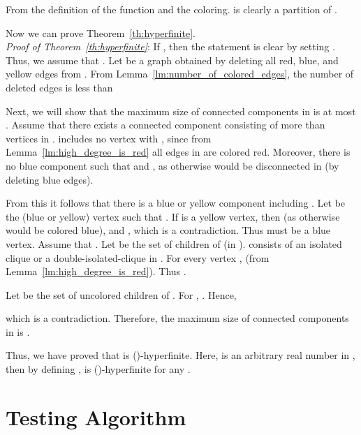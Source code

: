 \documentclass[11pt]{article}
\newcommand{\qed}{\hspace*{\fill} }
\begin{document}
From the definition of the function  and the coloring. 
 is clearly a partition of . 




Now we can prove Theorem~\ref{th:hyperfinite}. \\



\noindent
{\em Proof of Theorem~\ref{th:hyperfinite}}: 
If , 
then the statement is clear by setting 
. 
Thus, we assume that 
. 
Let  be a graph obtained by deleting all red, blue, and yellow edges from . 
From Lemma~\ref{lm:number_of_colored_edges}, 
the number of deleted edges is less than 


Next, we will show that 
the maximum size of connected components in  is at most 
. 
Assume that there exists a connected component   
consisting of more than  vertices in . 
 includes no vertex  with , since  
from 
Lemma~\ref{lm:high_degree_is_red} 
all edges in  are colored red. 
Moreover, there is no blue component  such that 
 and , 
as otherwise  would be disconnected in  (by deleting blue edges). 

From this it follows that there is a blue or yellow component  including . 
Let  be the (blue or yellow) vertex 
such that . 
If  is a yellow vertex, 
then  
(as otherwise  would be colored blue), and , which is a contradiction.  
Thus  must be a blue vertex. 
Assume that . 
Let  be the set of children of  (in ). 
 consists of an isolated clique or 
a double-isolated-clique in . 
For every vertex ,   
(from Lemma~\ref{lm:high_degree_is_red}). 
Thus . 

Let  be the set of uncolored children of . 
For , . 
Hence, 
 
which is a contradiction. 
Therefore, the maximum size of connected components in  is . 




Thus, we have proved that  is 
()-hyperfinite. 
Here,  is an arbitrary real number in , 
then by defining 
, 
 is 
()-hyperfinite 
for any . \qed\\











\section{Testing Algorithm}
\end{document}
